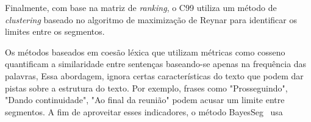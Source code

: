 Finalmente, com base na matriz de \textit{ranking}, o C99 utiliza um método de \textit{clustering} baseado no algoritmo de maximização de Reynar para identificar os limites entre os segmentos. 




Os métodos baseados em coesão léxica que utilizam métricas como cosseno quantificam a similaridade entre sentenças baseando-se apenas na frequência das palavras, Essa abordagem, ignora certas características do texto que podem dar pistas sobre a estrutura do texto. Por exemplo, frases como "Prosseguindo", "Dando continuidade", "Ao final da reunião" podem acusar um limite entre segmentos. A fim de aproveitar esses indicadores, o método BayesSeg~\cite{} usa









